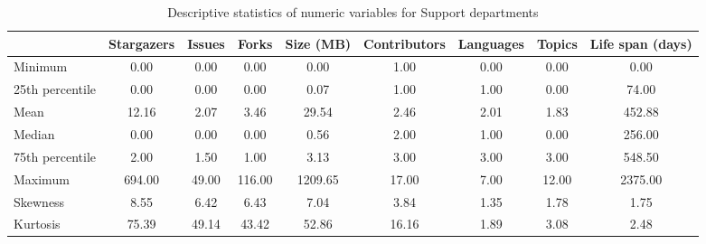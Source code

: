 \begin{table}
\centering
\caption{Descriptive statistics of numeric variables for Support departments}
\label{tab:Support_departments}
\begin{tabular}{lcccccccc}
\toprule
{} &  Stargazers &  Issues &   Forks &  Size (MB) &  Contributors &  Languages &  Topics &  Life span (days) \\
\midrule
Minimum         &        0.00 &    0.00 &    0.00 &       0.00 &          1.00 &       0.00 &    0.00 &              0.00 \\
25th percentile &        0.00 &    0.00 &    0.00 &       0.07 &          1.00 &       1.00 &    0.00 &             74.00 \\
Mean            &       12.16 &    2.07 &    3.46 &      29.54 &          2.46 &       2.01 &    1.83 &            452.88 \\
Median          &        0.00 &    0.00 &    0.00 &       0.56 &          2.00 &       1.00 &    0.00 &            256.00 \\
75th percentile &        2.00 &    1.50 &    1.00 &       3.13 &          3.00 &       3.00 &    3.00 &            548.50 \\
Maximum         &      694.00 &   49.00 &  116.00 &    1209.65 &         17.00 &       7.00 &   12.00 &           2375.00 \\
Skewness        &        8.55 &    6.42 &    6.43 &       7.04 &          3.84 &       1.35 &    1.78 &              1.75 \\
Kurtosis        &       75.39 &   49.14 &   43.42 &      52.86 &         16.16 &       1.89 &    3.08 &              2.48 \\
\bottomrule
\end{tabular}
\end{table}
